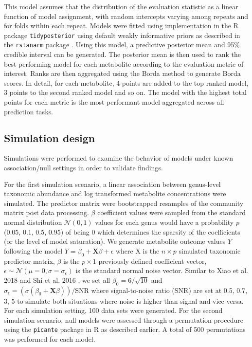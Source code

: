 \noindent This model assumes that the distribution of the evaluation statistic as a linear function of model assignment, with random intercepts varying among repeats and for folds within each repeat. Models were fitted using implementation in the R package \texttt{tidyposterior} \cite{kuhn2018tidyposterior} using default weakly informative priors as described in the \texttt{rstanarm} package \cite{brillemanjoint}. Using this model, a predictive posterior mean and 95\% credible interval can be generated. The posterior mean is then used to rank the best performing model for each metabolite according to the evaluation metric of interest. Ranks are then aggregated using the Borda method \cite{lin2010rank} to generate Borda scores. In detail, for each metabolite, 4 points are added to the top ranked model, 3 points to the second ranked model and so on. The model with the highest total points for each metric is the most performant model aggregated across all prediction tasks.

\subsection{Simulation design}

Simulations were performed to examine the behavior of models under known association/null settings in order to validate findings. 

For the first simulation scenario, a linear association between genus-level taxonomic abundance and log transformed metabolite concentrations were simulated. The predictor matrix were bootstrapped resamples of the community matrix post data processing. $\beta$ coefficient values were sampled from the standard normal distribution $\mathcal{N}(0,1)$ values for each genus would have a probability $p$ (0.05, 0.1, 0.5, 0.95) of being 0 which determines the sparsity of the coefficients (or the level of model saturation). We generate metabolite outcome values $Y$ following the model $Y = \beta_0 + \mathbf{X}\beta + \epsilon$
where X is the $n \times p$ simulated taxonomic predictor matrix, $\beta$ is the $p \times 1$ previously defined coefficient vector, $\epsilon  \sim \mathcal{N}(\mu=0,\sigma=\sigma_\epsilon )$ is the standard normal noise vector. Similar to Xiao et al. 2018 \cite{xiao2018phylogenyregularized} and Shi et al. 2016 \cite{shi2016regression}, we set all $\beta_0 = 6/\sqrt{10}$ and $\sigma_\epsilon=(\sigma(\beta_0+\mathbf{X}\beta))/\text{SNR}$ where signal-to-noise ratio (SNR) are set at 0.5, 0.7, 3, 5 to simulate both situations where noise is higher than signal and vice versa. For each simulation setting, 100 data sets were generated. For the second simulation scenario, null models were assessed through a permutation procedure using the \texttt{picante} package in R as described earlier. A total of 500 permutations was performed for each model. 

